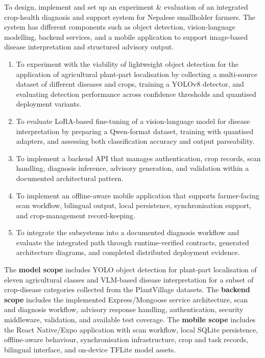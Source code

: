 

To design, implement and set up an experiment \& evaluation of an integrated crop-health diagnosis and support system for Nepalese smallholder farmers. 
The system has different components such as object detection, vision-language modelling,
backend services, and a mobile application to support image-based disease interpretation and
structured advisory output.

\begin{enumerate}[label=\arabic*.]
\item To experiment with the viability of lightweight object detection for the application of agricultural plant-part
localisation by collecting a multi-source dataset of different diseases and crops, training a YOLOv8 detector, and
evaluating detection performance across confidence thresholds and quantised deployment variants.
\item To evaluate LoRA-based fine-tuning of a vision-language model for disease
interpretation by preparing a Qwen-format dataset, training with quantised adapters, and
assessing both classification accuracy and output parseability.
\item To implement a backend API that manages authentication, crop records, scan
handling, diagnosis inference, advisory generation, and validation within a documented
architectural pattern.
\item To implement an offline-aware mobile application that supports farmer-facing scan workflow,
bilingual output, local persistence, synchronisation support, and crop-management
record-keeping.
\item To integrate the subsystems into a documented diagnosis workflow and evaluate the
integrated path through runtime-verified contracts, generated architecture diagrams, and
completed distributed deployment evidence.
\end{enumerate}


The \textbf{model scope} includes YOLO object detection for plant-part localisation of
eleven agricultural classes and VLM-based disease interpretation for a subset of crop-disease
categories collected from the PlantVillage datasets. The \textbf{backend scope} includes the
implemented Express/Mongoose service architecture, scan and diagnosis workflow, advisory
response handling, authentication, security middleware, validation, and available test coverage.
The \textbf{mobile scope} includes the React Native/Expo application with scan workflow, local
SQLite persistence, offline-aware behaviour, synchronisation infrastructure, crop and task
records, bilingual interface, and on-device TFLite model assets.

